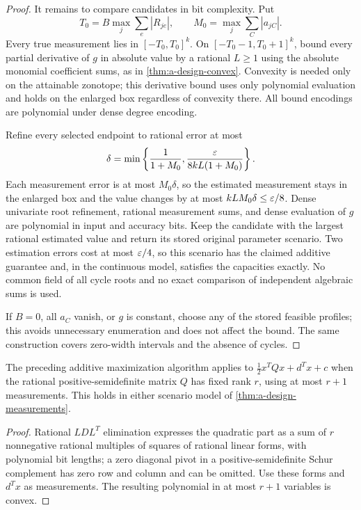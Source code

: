 \begin{proof}
It remains to compare candidates in bit complexity.  Put
\[
 T_0=B\max_j\sum_e|R_{je}|,\qquad
 M_0=\max_j\sum_C|a_{jC}|.
\]
Every true measurement lies in $[-T_0,T_0]^k$.  On
$[-T_0-1,T_0+1]^k$, bound every partial derivative of $g$ in
absolute value by a rational $L\ge1$ using the absolute monomial
coefficient sums, as in \cref{thm:a-design-convex}.  Convexity is
needed only on the attainable zonotope; this derivative bound uses
only polynomial evaluation and holds on the enlarged box regardless of
convexity there.  All bound encodings are polynomial under dense degree
encoding.

Refine every selected endpoint to rational error at most
\[
 \delta=\min\left\{\frac1{1+M_0},
               \frac{\varepsilon}{8kL(1+M_0)}\right\}.
\]
Each measurement error is at most $M_0\delta$, so the estimated
measurement stays in the enlarged box and the value changes by at most
$kLM_0\delta\le\varepsilon/8$.  Dense univariate root refinement,
rational measurement sums, and dense evaluation of $g$ are
polynomial in input and accuracy bits.  Keep the candidate with
the largest rational estimated value and return its stored original
parameter scenario.  Two estimation errors cost at most $\varepsilon/4$,
so this scenario has the claimed additive guarantee and, in the
continuous model, satisfies the capacities exactly.  No common field of
all cycle roots and no exact comparison of independent algebraic sums
is used.

If $B=0$, all $a_C$ vanish, or $g$ is constant, choose any of the
stored feasible profiles; this avoids unnecessary enumeration and does
not affect the bound.  The same construction covers zero-width intervals
and the absence of cycles.
\end{proof}

\begin{corollary}
\label{cor:a-design-fixed-rank}
The preceding additive maximization algorithm applies to
$\tfrac12x^TQx+d^Tx+c$ when the rational positive-semidefinite
matrix $Q$ has fixed rank $r$, using at most $r+1$ measurements.
This holds in either scenario model of
\cref{thm:a-design-measurements}.
\end{corollary}
\begin{proof}
Rational $LDL^T$ elimination expresses the quadratic part as a sum
of $r$ nonnegative rational multiples of squares of rational linear
forms, with polynomial bit lengths; a zero diagonal pivot in a
positive-semidefinite Schur complement has zero row and column and
can be omitted.  Use these forms and $d^Tx$ as measurements.  The
resulting polynomial in at most $r+1$ variables is convex.
\end{proof}

